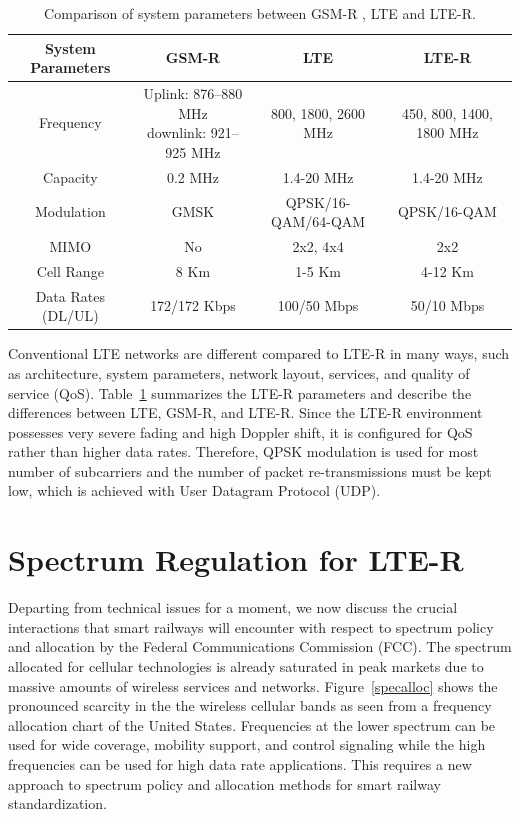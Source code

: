 \begin{table}[h!]
\caption{Comparison of system parameters between GSM-R , LTE and LTE-R.}
\begin{adjustbox}{width=\textwidth, center=\textwidth}
\begin{tabular}{| c | c | c | c |}
\toprule
System Parameters & GSM-R & LTE & LTE-R\\ 
\midrule
Frequency & \shortstack{Uplink: 876--880 MHz\\downlink: 921--925 MHz} & 800, 1800, 2600 MHz & 450, 800, 1400, 1800 MHz \\  
Capacity  & 0.2 MHz & 1.4-20 MHz & 1.4-20 MHz\\ 
Modulation  & GMSK & QPSK/16-QAM/64-QAM & QPSK/16-QAM\\ 
MIMO  & No  & 2x2, 4x4  & 2x2\\ 
Cell Range  & 8 Km  & 1-5 Km & 4-12 Km \\ 
Data Rates (DL/UL)  & 172/172 Kbps  & 100/50 Mbps & 50/10 Mbps\\ 
\bottomrule
\end{tabular}
\end{adjustbox}
\label{ltertable}
\end{table}

Conventional LTE networks are different compared to LTE-R in many ways, such as architecture, system parameters, network layout, services, and quality of service (QoS). Table~\ref{ltertable} summarizes the LTE-R parameters and describe the differences between LTE, GSM-R, and LTE-R. Since the LTE-R environment possesses very severe fading and high Doppler shift, it is configured for QoS rather than higher data rates. Therefore, QPSK modulation is used for most number of subcarriers and the number of packet re-transmissions must be kept low, which is achieved with User Datagram Protocol (UDP).


\section{Spectrum Regulation for LTE-R}

Departing from technical issues for a moment, we now discuss the crucial interactions that smart railways will encounter with respect to spectrum policy and allocation by the Federal Communications Commission (FCC). The spectrum allocated for cellular technologies is already saturated in peak markets due to massive amounts of wireless services and networks. Figure~\ref{specalloc} shows the pronounced scarcity in the the wireless cellular bands as seen from a frequency allocation chart of the United States. Frequencies at the lower spectrum can be used for wide coverage, mobility support, and control signaling while the high frequencies can be used for high data rate applications. This requires a new approach to spectrum policy and allocation methods for smart railway standardization.

